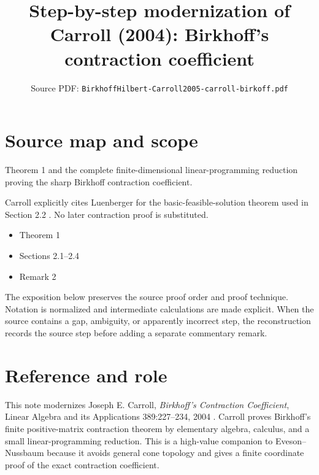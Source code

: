 

\title{Step-by-step modernization of Carroll (2004): Birkhoff's contraction coefficient}
\author{}
\date{Source PDF: \texttt{BirkhoffHilbert-Carroll2005-carroll-birkoff.pdf}}

\maketitle

\section*{Source map and scope}
\begin{description}[style=nextline,leftmargin=3.2cm,labelwidth=3cm]
\item[Primary source] \texttt{}
\item[Coverage] Theorem 1 and the complete finite-dimensional linear-programming reduction proving the sharp Birkhoff contraction coefficient.
\item[Supplemental references] Carroll explicitly cites Luenberger for the basic-feasible-solution theorem used in Section 2.2 \cite{Luenberger1984}.  No later contraction proof is substituted.
\item[Source anchors]
\begin{itemize}[leftmargin=2em]
  \item Theorem 1
  \item Sections 2.1--2.4
  \item Remark 2
\end{itemize}
\end{description}

The exposition below preserves the source proof order and proof technique.  Notation is normalized
and intermediate calculations are made explicit.  When the source contains a gap, ambiguity, or
apparently incorrect step, the reconstruction records the source step before adding a separate
commentary remark.

\section*{Reference and role}
This note modernizes Joseph E. Carroll, \emph{Birkhoff's Contraction Coefficient},
Linear Algebra and its Applications 389:227--234, 2004 \cite{Carroll2004}.  Carroll
proves Birkhoff's finite positive-matrix contraction theorem by elementary algebra,
calculus, and a small linear-programming reduction.  This is a high-value companion
to Eveson--Nussbaum because it avoids general cone topology and gives a finite
coordinate proof of the exact contraction coefficient.

